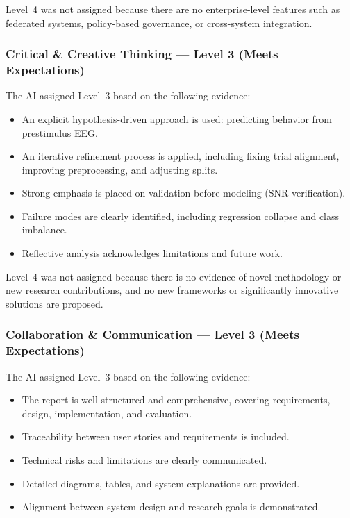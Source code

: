 Level~4 was not assigned because there are no enterprise-level features such as federated
systems, policy-based governance, or cross-system integration.

\subsubsection{Critical \& Creative Thinking — Level 3 (Meets Expectations)}

The AI assigned Level~3 based on the following evidence:
\begin{itemize}
    \item An explicit hypothesis-driven approach is used: predicting behavior from prestimulus EEG.
    \item An iterative refinement process is applied, including fixing trial alignment, improving preprocessing, and adjusting splits.
    \item Strong emphasis is placed on validation before modeling (SNR verification).
    \item Failure modes are clearly identified, including regression collapse and class imbalance.
    \item Reflective analysis acknowledges limitations and future work.
\end{itemize}

Level~4 was not assigned because there is no evidence of novel methodology or new
research contributions, and no new frameworks or significantly innovative solutions are proposed.

\subsubsection{Collaboration \& Communication — Level 3 (Meets Expectations)}

The AI assigned Level~3 based on the following evidence:
\begin{itemize}
    \item The report is well-structured and comprehensive, covering requirements, design, implementation, and evaluation.
    \item Traceability between user stories and requirements is included.
    \item Technical risks and limitations are clearly communicated.
    \item Detailed diagrams, tables, and system explanations are provided.
    \item Alignment between system design and research goals is demonstrated.
\end{itemize}

